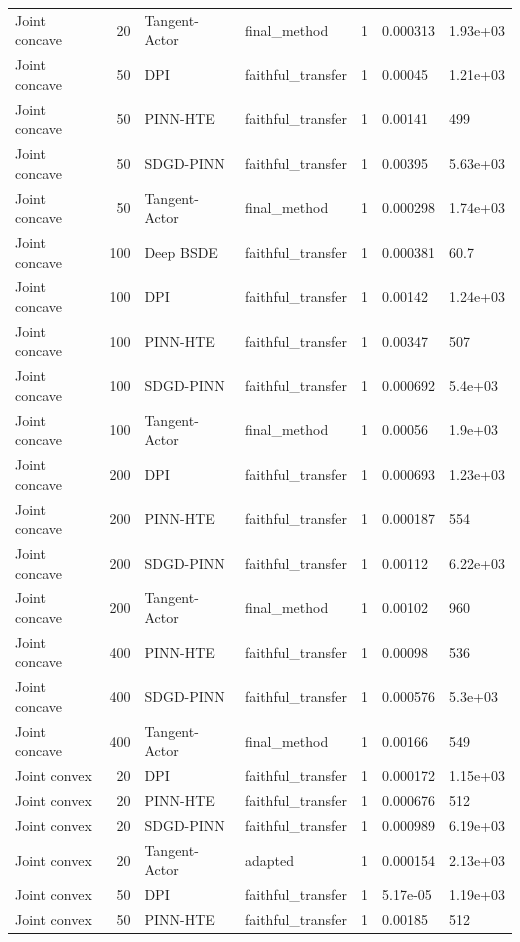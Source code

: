 \begin{tabular}{lrllrll}
Joint concave & 20 & Tangent-Actor & final\_method & 1 & 0.000313 & 1.93e+03 \\
Joint concave & 50 & DPI & faithful\_transfer & 1 & 0.00045 & 1.21e+03 \\
Joint concave & 50 & PINN-HTE & faithful\_transfer & 1 & 0.00141 & 499 \\
Joint concave & 50 & SDGD-PINN & faithful\_transfer & 1 & 0.00395 & 5.63e+03 \\
Joint concave & 50 & Tangent-Actor & final\_method & 1 & 0.000298 & 1.74e+03 \\
Joint concave & 100 & Deep BSDE & faithful\_transfer & 1 & 0.000381 & 60.7 \\
Joint concave & 100 & DPI & faithful\_transfer & 1 & 0.00142 & 1.24e+03 \\
Joint concave & 100 & PINN-HTE & faithful\_transfer & 1 & 0.00347 & 507 \\
Joint concave & 100 & SDGD-PINN & faithful\_transfer & 1 & 0.000692 & 5.4e+03 \\
Joint concave & 100 & Tangent-Actor & final\_method & 1 & 0.00056 & 1.9e+03 \\
Joint concave & 200 & DPI & faithful\_transfer & 1 & 0.000693 & 1.23e+03 \\
Joint concave & 200 & PINN-HTE & faithful\_transfer & 1 & 0.000187 & 554 \\
Joint concave & 200 & SDGD-PINN & faithful\_transfer & 1 & 0.00112 & 6.22e+03 \\
Joint concave & 200 & Tangent-Actor & final\_method & 1 & 0.00102 & 960 \\
Joint concave & 400 & PINN-HTE & faithful\_transfer & 1 & 0.00098 & 536 \\
Joint concave & 400 & SDGD-PINN & faithful\_transfer & 1 & 0.000576 & 5.3e+03 \\
Joint concave & 400 & Tangent-Actor & final\_method & 1 & 0.00166 & 549 \\
Joint convex & 20 & DPI & faithful\_transfer & 1 & 0.000172 & 1.15e+03 \\
Joint convex & 20 & PINN-HTE & faithful\_transfer & 1 & 0.000676 & 512 \\
Joint convex & 20 & SDGD-PINN & faithful\_transfer & 1 & 0.000989 & 6.19e+03 \\
Joint convex & 20 & Tangent-Actor & adapted & 1 & 0.000154 & 2.13e+03 \\
Joint convex & 50 & DPI & faithful\_transfer & 1 & 5.17e-05 & 1.19e+03 \\
Joint convex & 50 & PINN-HTE & faithful\_transfer & 1 & 0.00185 & 512 \\

\end{tabular}
